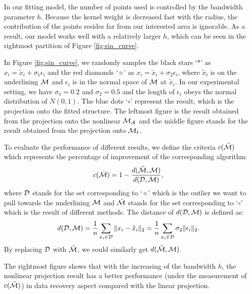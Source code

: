 \documentclass{article}
\theoremstyle{remark}
\begin{document}
In our fitting model, the number of points used is controlled by the bandwidth parameter $h$. Because the kernel weight is decreased fast with the radius, the contribution of the points resides far from our interested area is ignorable. As a result, our model works well with a relatively larger $h$, which can be seen in the rightmost partition of Figure \eqref{fig:sin_curve}.

In Figure \eqref{fig:sin_curve}, we randomly samples the black stars `*' as $x_i = \tilde{x}_i+\sigma_1\epsilon_i$ and the red diamonds `$\diamond$' as $x_i = \tilde{x}_i+\sigma_2\epsilon_i$, where $\tilde{x}_i$ is on the underlining $\cal M$ and $\epsilon_i$ is in the normal space of $\cal M$ at $\tilde{x}_i$. In our experimental setting, we have $\sigma_1=0.2$ and $\sigma_2=0.5$ and the length of $\epsilon_i$ obeys the normal distribution of $N(0,1)$. The blue dots `$\circ$' represent the result, which is the projection onto the fitted structure. The leftmost figure is the result obtained from the projection onto the nonlinear $\cal M_A$ and the middle figure stands for the result obtained from the projection onto $\cal M_\ell$.

To evaluate the performance of different results, we define the criteria $c({\hat{\cal M}})$ which represents the percentage of improvement of the corresponding algorithm
\[
c({\hat{\cal M}}) = 1-\frac{d(\hat{\cal M}, {\cal M})}{d({\cal D}, {\cal M})},
\] 
where $\cal D$ stands for the set corresponding to `$\diamond$' which is the outlier we want to pull towards the underlining $\cal M$ and $\hat{\cal M}$ stands for the set corresponding to `$\circ$' which is the result of different methods. The distance of $d({\cal D}, {\cal M})$ is defined as:
\[
d({\cal D}, {\cal M}) = \frac{1}{n} \sum_{x_i\in {\cal D}} \|x_i-\tilde{x}_i\|_2 = \frac{1}{n} \sum_{x_i\in \cal D} \sigma_2\|\epsilon_i\|_2.
\] 
By replacing $\cal D$ with $\hat{\cal M}$, we could similarly get $d(\hat{\cal M}, {\cal M})$.

The rightmost figure shows that with the increasing of the bandwidth $h$, the nonlinear projection result has a better performance (under the measurement of $c({\hat{\cal M}})$) in data recovery aspect compared with the linear projection.

\end{document}
